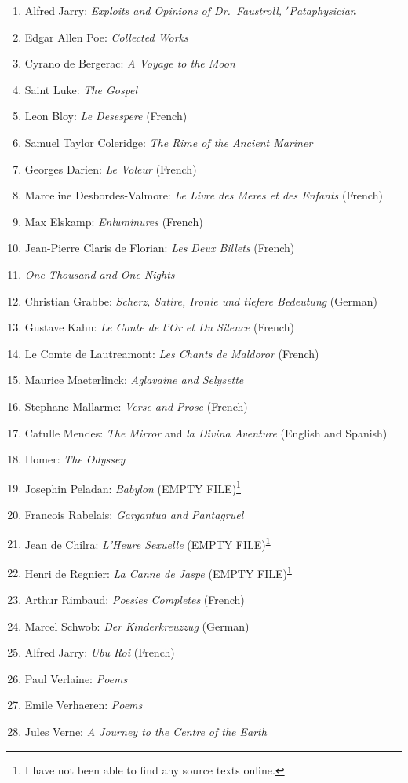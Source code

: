 \begin{enumerate}[start=0]
\item Alfred Jarry: \emph{Exploits and Opinions of Dr.\ Faustroll, $'$Pataphysician}
\item Edgar Allen Poe: \emph{Collected Works}
\item Cyrano de Bergerac: \emph{A Voyage to the Moon}
\item Saint Luke: \emph{The Gospel}
\item Leon Bloy: \emph{Le Desespere} (French)
\item Samuel Taylor Coleridge: \emph{The Rime of the Ancient Mariner}
\item Georges Darien: \emph{Le Voleur} (French)
\item Marceline Desbordes-Valmore: \emph{Le Livre des Meres et des Enfants} (French)
\item Max Elskamp: \emph{Enluminures} (French)
\item Jean-Pierre Claris de Florian: \emph{Les Deux Billets} (French)
\item \emph{One Thousand and One Nights}
\item Christian Grabbe: \emph{Scherz, Satire, Ironie und tiefere Bedeutung} (German)
\item Gustave Kahn: \emph{Le Conte de l'Or et Du Silence} (French)
\item Le Comte de Lautreamont: \emph{Les Chants de Maldoror} (French)
\item Maurice Maeterlinck: \emph{Aglavaine and Selysette}
\item Stephane Mallarme: \emph{Verse and Prose} (French)
\item Catulle Mendes: \emph{The Mirror} and \emph{la Divina Aventure} (English and Spanish)
\item Homer: \emph{The Odyssey}
\item Josephin Peladan: \emph{Babylon} (EMPTY FILE)\footnote{I have not been able to find any source texts online.\label{emptyfile}}
\item Francois Rabelais: \emph{Gargantua and Pantagruel}
\item Jean de Chilra: \emph{L'Heure Sexuelle} (EMPTY FILE)\textsuperscript{\ref{emptyfile}}
\item Henri de Regnier: \emph{La Canne de Jaspe} (EMPTY FILE)\textsuperscript{\ref{emptyfile}}
\item Arthur Rimbaud: \emph{Poesies Completes} (French)
\item Marcel Schwob: \emph{Der Kinderkreuzzug} (German)
\item Alfred Jarry: \emph{Ubu Roi} (French)
\item Paul Verlaine: \emph{Poems}
\item Emile Verhaeren: \emph{Poems}
\item Jules Verne: \emph{A Journey to the Centre of the Earth}
\end{enumerate}

